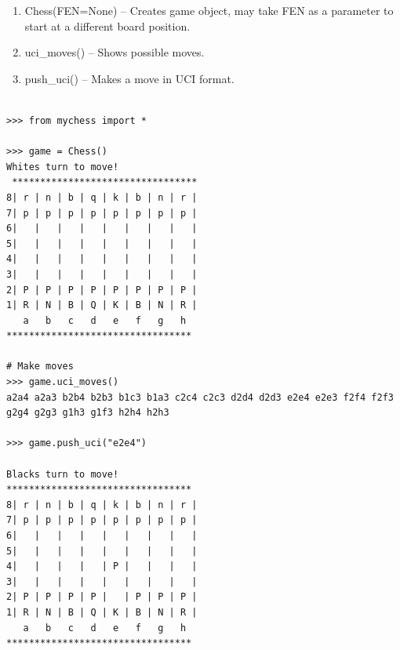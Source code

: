 \documentclass[10pt]{article}
\begin{document}
\begin{enumerate}[label=\arabic*)]
\item Chess(FEN=None) -- Creates game object, may take FEN as a parameter to start at a
    different board position.
\item uci\_moves() -- Shows possible moves.
\item push\_uci() -- Makes a move in UCI format.
\end{enumerate}



\begin{lstlisting}

>>> from mychess import *

>>> game = Chess()
Whites turn to move!
 *********************************
8| r | n | b | q | k | b | n | r |
7| p | p | p | p | p | p | p | p |
6|   |   |   |   |   |   |   |   |
5|   |   |   |   |   |   |   |   |
4|   |   |   |   |   |   |   |   |
3|   |   |   |   |   |   |   |   |
2| P | P | P | P | P | P | P | P |
1| R | N | B | Q | K | B | N | R |
   a   b   c   d   e   f   g   h
*********************************

# Make moves
>>> game.uci_moves()
a2a4 a2a3 b2b4 b2b3 b1c3 b1a3 c2c4 c2c3 d2d4 d2d3 e2e4 e2e3 f2f4 f2f3 g2g4 g2g3 g1h3 g1f3 h2h4 h2h3

>>> game.push_uci("e2e4")

Blacks turn to move!
*********************************
8| r | n | b | q | k | b | n | r |
7| p | p | p | p | p | p | p | p |
6|   |   |   |   |   |   |   |   |
5|   |   |   |   |   |   |   |   |
4|   |   |   |   | P |   |   |   |
3|   |   |   |   |   |   |   |   |
2| P | P | P | P |   | P | P | P |
1| R | N | B | Q | K | B | N | R |
   a   b   c   d   e   f   g   h
*********************************


\end{lstlisting}
\end{document}
